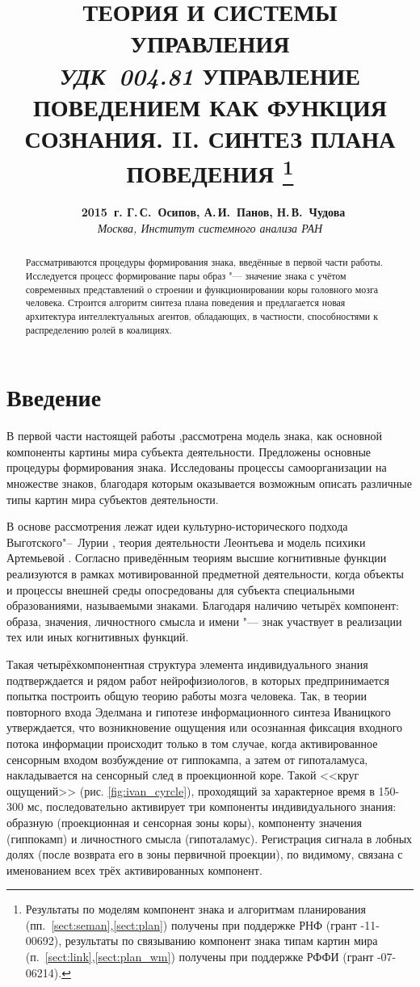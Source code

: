 \documentclass[a4paper, 12pt]{article}
\title{
	\hbox{}\textbf{\Large\MakeUppercase{Теория и системы управления}}\\
	\hbox{\normalsize\textit{УДК 004.81}}
	\hbox{}\textbf{\Large\MakeUppercase{Управление поведением как функция сознания. II. Синтез плана поведения}}
	\footnote{Результаты по моделям компонент знака и алгоритмам планирования (пп.~\ref{sect:seman},\ref{sect:plan}) получены при поддержке РНФ (грант \textnumero 14-11-00692), результаты по связыванию компонент знака типам картин мира (п.~\ref{sect:link},\ref{sect:plan_wm}) получены при поддержке РФФИ (грант \textnumero 15-07-06214).}
}
\author{
	\textbf{\textcopyright~2015~г. Г.\,С.~Осипов, А.\,И.~Панов, Н.\,В.~Чудова}\\
	\normalsize\textit{Москва, Институт системного анализа РАН}
}
\date{}
\theoremstyle{plain}
\begin{document}
	\vspace*{-5\baselineskip}			%
	{\let\newpage\relax\maketitle}
	
	\begin{abstract}
		\noindent Рассматриваются процедуры формирования знака, введённые в первой части работы. Исследуется процесс формирование пары образ "--- значение знака с учётом современных представлений о строении и функционировании коры головного мозга человека. Строится алгоритм синтеза плана поведения и предлагается новая архитектура интеллектуальных агентов, обладающих, в частности, способностями к распределению ролей в коалициях.
	\end{abstract}	
	
	\section*{Введение}
	В первой части настоящей работы \cite{PanovA2014a},рассмотрена модель знака, как основной компоненты картины мира субъекта деятельности. Предложены основные процедуры формирования знака. Исследованы процессы самоорганизации на множестве знаков, благодаря которым оказывается возможным описать различные типы картин мира субъектов деятельности.
	
	В основе рассмотрения лежат идеи культурно-исторического подхода Выготского"--~Лурии \cite{Luria1970,Vygotsky2005}, теория деятельности Леонтьева \cite{Leontiev1975} и модель психики Артемьевой \cite{Artemyeva1980}. Согласно приведённым теориям высшие когнитивные функции реализуются в рамках мотивированной предметной деятельности, когда объекты и процессы внешней  среды опосредованы для субъекта специальными образованиями, называемыми знаками. Благодаря наличию четырёх компонент: образа, значения, личностного смысла и имени "--- знак участвует в реализации тех или иных когнитивных функций. 
	
	Такая четырёхкомпонентная структура элемента индивидуального знания подтверждается и рядом работ нейрофизиологов, в которых предпринимается попытка построить общую теорию работы мозга человека. Так, в теории повторного входа Эделмана \cite{Edelmen1981} и гипотезе информационного синтеза Иваницкого \cite{Ivanitsky1996,Ivanitsky2010} утверждается, что возникновение ощущения или осознанная фиксация входного потока информации происходит только в том случае, когда активированное сенсорным входом возбуждение от гиппокампа, а затем от гипоталамуса, накладывается на сенсорный след в проекционной коре. Такой <<круг ощущений>> (рис. \ref{fig:ivan_cyrcle}), проходящий за характерное время в 150-300 мс, последовательно активирует три компоненты индивидуального знания: образную (проекционная и сенсорная зоны коры), компоненту значения (гиппокамп) и личностного смысла (гипоталамус). Регистрация сигнала в лобных долях (после возврата его в зоны первичной проекции), по видимому, связана с именованием всех трёх активированных компонент.
	
\end{document}
